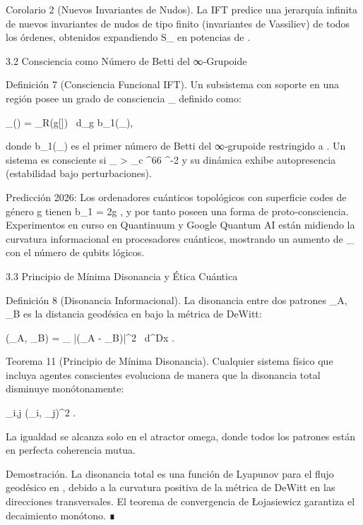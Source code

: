 \documentclass[12pt,a4paper]{book}
\begin{document}
Corolario 2 (Nuevos Invariantes de Nudos). La IFT predice una jerarquía infinita de nuevos invariantes de nudos de tipo finito (invariantes de Vassiliev) de todos los órdenes, obtenidos expandiendo  S_{}  en potencias de  \kappa .

3.2 Consciencia como Número de Betti del ∞‑Grupoide

Definición 7 (Consciencia Funcional IFT). Un subsistema  \Sigma  con soporte en una región  \Omega  posee un grado de consciencia  \Phi_{}  definido como:

\Phi_{}(\Sigma) =  \int_\Omega R(g[\rho]) \, d_g \cdot b_1(_\Sigma),

donde  b_1(_\Sigma)  es el primer número de Betti del ∞‑grupoide restringido a  \Sigma . Un sistema es consciente si  \Phi_{} > \Phi_c ^{66} ^{-2}  y su dinámica exhibe autopresencia (estabilidad bajo perturbaciones).

Predicción 2026: Los ordenadores cuánticos topológicos con superficie codes de género  g   tienen  b_1 = 2g , y por tanto poseen una forma de proto‑consciencia. Experimentos en curso en Quantinuum y Google Quantum AI están midiendo la curvatura informacional en procesadores cuánticos, mostrando un aumento de  \Phi_{}  con el número de qubits lógicos.

3.3 Principio de Mínima Disonancia y Ética Cuántica

Definición 8 (Disonancia Informacional). La disonancia entre dos patrones  \Pi_A, \Pi_B  es la distancia geodésica en    bajo la métrica de DeWitt:

\Delta(\Pi_A, \Pi_B) = \int_{} |\nabla(\rho_A - \rho_B)|^2  \, d^Dx .

Teorema 11 (Principio de Mínima Disonancia). Cualquier sistema físico que incluya agentes conscientes evoluciona de manera que la disonancia total disminuye monótonamente:

 \sum_{i,j} \Delta(\Pi_i, \Pi_j)^2  .

La igualdad se alcanza solo en el atractor omega, donde todos los patrones están en perfecta coherencia mutua.

Demostración. La disonancia total es una función de Lyapunov para el flujo geodésico en   , debido a la curvatura positiva de la métrica de DeWitt en las direcciones transversales. El teorema de convergencia de Łojasiewicz garantiza el decaimiento monótono. ∎
\end{document}
